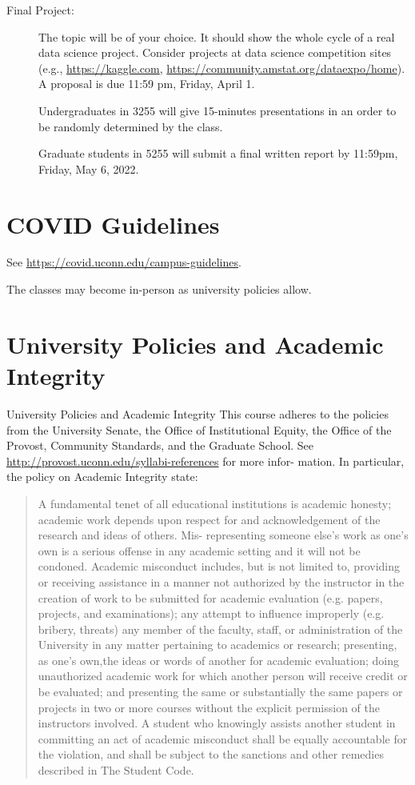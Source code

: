 \documentclass{article}
\begin{document}
\begin{multicols}{2}
\begin{description}
\item[Final Project:]
  The topic will be of your choice. It should show
  the whole cycle of a real data science project. Consider projects at
  data science competition sites (e.g., \url{https://kaggle.com},
  \url{https://community.amstat.org/dataexpo/home}).
  A proposal is due 11:59 pm, Friday, April 1.

  Undergraduates in 3255 will give 15-minutes presentations in an
  order to be randomly determined by the class.
  
  Graduate students in 5255 will submit a final written report by
  11:59pm, Friday, May 6, 2022.

\end{description}
\end{multicols}

\section*{COVID Guidelines}
  See \url{https://covid.uconn.edu/campus-guidelines}.

  The classes may become in-person as university policies allow.

\section*{University Policies and Academic Integrity}
  University Policies and Academic Integrity
This course adheres to the policies from the University Senate, the
Office of Institutional Equity, the Office of the Provost, Community
Standards, and the Graduate School. See
\url{http://provost.uconn.edu/syllabi-references}
for more infor- mation. In particular, the policy on Academic
Integrity state:
\begin{quote}
A fundamental tenet of all educational institutions is academic
honesty; academic work depends upon respect for and acknowledgement of
the research and ideas of others. Mis- representing someone else’s
work as one’s own is a serious offense in any academic setting and it
will not be condoned. Academic misconduct includes, but is not limited
to, providing or receiving assistance in a manner not authorized by
the instructor in the creation of work to be submitted for academic
evaluation (e.g. papers, projects, and examinations); any attempt to
influence improperly (e.g. bribery, threats) any member of the
faculty, staff, or administration of the University in any matter
pertaining to academics or research; presenting, as one’s own,the
ideas or words of another for academic evaluation; doing
unauthorized academic work for which another person will receive
credit or be evaluated; and presenting the same or substantially the
same papers or projects in two or more courses without the explicit
permission of the instructors involved. A student who knowingly
assists another student in committing an act of academic misconduct
shall be equally accountable for the violation, and shall be subject
to the sanctions and other remedies described in The Student Code.
\end{quote}
\end{document}
